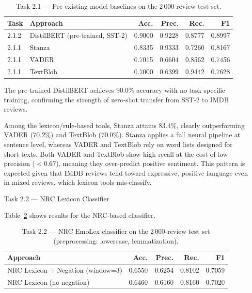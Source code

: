 \documentclass[12pt,reqno,twoside]{amsbook}
\makeatletter
\def\section{\@startsection{section}{1}%
      \z@{.5\linespacing\@plus.7\linespacing}{.25\linespacing}%
      {\normalfont\bfseries\flushleft}}
\theoremstyle{plain}
\numberwithin{equation}{chapter}
\numberwithin{section}{chapter}
\makeatother
\begin{document}
\begin{table}[ht]
\centering
\caption{Task 2.1 --- Pre-existing model baselines on the 2\,000-review test set.}
\label{tab:t21}
\begin{tabular}{llrrrr}
\toprule
Task & Approach & Acc. & Prec. & Rec. & F1 \\
\midrule
2.1.2 & DistilBERT (pre-trained, SST-2) & 0.9000 & 0.9228 & 0.8777 & 0.8997 \\
2.1.1 & Stanza                           & 0.8335 & 0.9333 & 0.7260 & 0.8167 \\
2.1.1 & VADER                            & 0.7015 & 0.6604 & 0.8562 & 0.7456 \\
2.1.1 & TextBlob                         & 0.7000 & 0.6399 & 0.9442 & 0.7628 \\
\bottomrule
\end{tabular}
\end{table}

\noindent The pre-trained DistilBERT achieves 90.0\% accuracy with no task-specific
training, confirming the strength of zero-shot transfer from SST-2 to IMDB reviews.

Among the lexicon/rule-based tools, Stanza attains 83.4\%, clearly outperforming
VADER (70.2\%) and TextBlob (70.0\%).
Stanza applies a full neural pipeline at sentence level, whereas VADER and TextBlob
rely on word lists designed for short texts.
Both VADER and TextBlob show high recall at the cost of low precision ($< 0.67$),
meaning they over-predict positive sentiment.
This pattern is expected given that IMDB reviews tend toward expressive, positive
language even in mixed reviews, which lexicon tools mis-classify.

\section{Task 2.2 --- NRC Lexicon Classifier}

\noindent Table~\ref{tab:t22} shows results for the NRC-based classifier.

\begin{table}[ht]
\centering
\caption{Task 2.2 --- NRC EmoLex classifier on the 2\,000-review test set
(preprocessing: lowercase, lemmatization).}
\label{tab:t22}
\begin{tabular}{lrrrr}
\toprule
Approach & Acc. & Prec. & Rec. & F1 \\
\midrule
NRC Lexicon + Negation (window=3) & 0.6550 & 0.6254 & 0.8102 & 0.7059 \\
NRC Lexicon (no negation)         & 0.6460 & 0.6160 & 0.8160 & 0.7020 \\
\bottomrule
\end{tabular}
\end{table}
\end{document}
